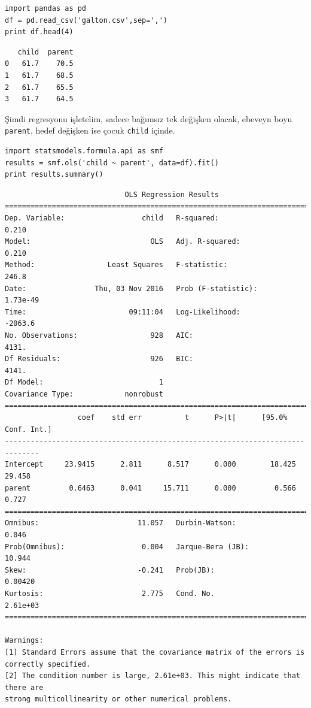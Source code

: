 \documentclass[12pt,fleqn]{article}\usepackage{../../common}
\begin{document}
\begin{verbatim}
import pandas as pd
df = pd.read_csv('galton.csv',sep=',')
print df.head(4)
\end{verbatim}

\begin{verbatim}
   child  parent
0   61.7    70.5
1   61.7    68.5
2   61.7    65.5
3   61.7    64.5
\end{verbatim}

Şimdi regresyonu işletelim, sadece bağımsız tek değişken olacak, ebeveyn
boyu \verb!parent!, hedef değişken ise çocuk \verb!child! içinde.

\begin{verbatim}
import statsmodels.formula.api as smf
results = smf.ols('child ~ parent', data=df).fit()
print results.summary()
\end{verbatim}

\begin{verbatim}
                            OLS Regression Results                            
==============================================================================
Dep. Variable:                  child   R-squared:                       0.210
Model:                            OLS   Adj. R-squared:                  0.210
Method:                 Least Squares   F-statistic:                     246.8
Date:                Thu, 03 Nov 2016   Prob (F-statistic):           1.73e-49
Time:                        09:11:04   Log-Likelihood:                -2063.6
No. Observations:                 928   AIC:                             4131.
Df Residuals:                     926   BIC:                             4141.
Df Model:                           1                                         
Covariance Type:            nonrobust                                         
==============================================================================
                 coef    std err          t      P>|t|      [95.0% Conf. Int.]
------------------------------------------------------------------------------
Intercept     23.9415      2.811      8.517      0.000        18.425    29.458
parent         0.6463      0.041     15.711      0.000         0.566     0.727
==============================================================================
Omnibus:                       11.057   Durbin-Watson:                   0.046
Prob(Omnibus):                  0.004   Jarque-Bera (JB):               10.944
Skew:                          -0.241   Prob(JB):                      0.00420
Kurtosis:                       2.775   Cond. No.                     2.61e+03
==============================================================================

Warnings:
[1] Standard Errors assume that the covariance matrix of the errors is correctly specified.
[2] The condition number is large, 2.61e+03. This might indicate that there are
strong multicollinearity or other numerical problems.
\end{verbatim}
\end{document}
